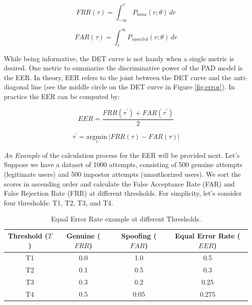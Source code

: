 \begin{equation}
    FRR(\tau) = \int_{-\infty}^{\tau} P_{bona}(r;\theta) \,dr
\end{equation}

\begin{equation}
    FAR(\tau) = \int_{\tau}^{\infty} P_{spoofed}(r;\theta) \,dr
\end{equation}

While being informative, the DET curve is not handy when a single metric is desired. One metric to summarize the discriminative power of the PAD model is the EER. In theory, EER refers to the joint between the DET curve and the anti-diagonal line (see the middle circle on the DET curve in Figure \ref{fig:error}). In practice the EER can be computed by:

\begin{equation}
    EER = \frac{FRR(\tau^{\prime}) + FAR(\tau^{\prime})}{2}
\end{equation}

\begin{equation}
    \tau^{\prime} = \underset{\tau}{\mathrm{arg min}} \ |FRR(\tau)-FAR(\tau)|
\end{equation}

\textit{An Example} of the calculation process for the EER will be provided next. Let's Suppose we have a dataset of 1000 attempts, consisting of 500 genuine attempts (legitimate users) and 500 impostor attempts (unauthorized users). We sort the scores in ascending order and calculate the False Acceptance Rate (FAR) and False Rejection Rate (FRR) at different thresholds. For simplicity, let's consider four thresholds: T1, T2, T3, and T4.

\begin{center}
    \begin{table}[h]
    \centering
        \begin{tabular}{| c | c | c | c |} 
             \hline
             Threshold ($T$) & Genuine ($FRR$) & Spoofing ($FAR$) & Equal Error Rate ($EER$) \\ [0.5ex] 
             \hline
             T1 & 0.0 & 1.0 & 0.5 \\ 
             \hline
             T2 & 0.1 & 0.5 & 0.3 \\
             \hline
             T3 & 0.3 & 0.2 & 0.25 \\
             \hline
             T4 & 0.5 & 0.05 & 0.275 \\
             \hline
        \end{tabular}
        \caption{Equal Error Rate example at different Thresholds.}
        \label{table:EER}
    \end{table}
\end{center}

